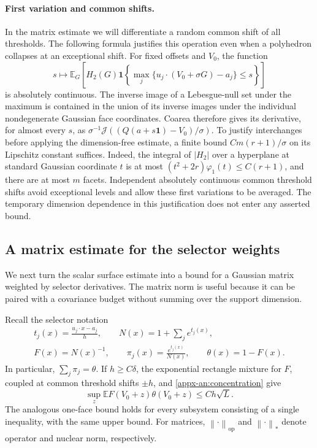 \documentclass[11pt,letterpaper]{article}
\theoremstyle{remark}
\newcommand{\E}{\mathbb E}
\newcommand{\norm}[1]{\left\lVert#1\right\rVert}
\newcommand{\ind}{\mathbf 1}
\newcommand{\Hh}{H_2}
\newcommand{\surf}{\mathcal J}
\begin{document}
\paragraph{First variation and common shifts.}
In the matrix estimate we will differentiate a random common shift of
all thresholds. The following formula justifies this operation even when
a polyhedron collapses at an exceptional shift. For fixed offsets and \(V_0\), the function
\[
 s\longmapsto
 \E_G\left[\Hh(G)\ind\left\{
   \max_j\{u_j\cdot(V_0+\sigma G)-a_j\}\le s\right\}\right]
\]
is absolutely continuous.  The inverse image of a Lebesgue-null set
under the maximum is contained in the union of its inverse images
under the individual nondegenerate Gaussian face coordinates.  Coarea
therefore gives its derivative, for almost every \(s\), as
\(\sigma^{-1}\surf((Q(a+s\mathbf1)-V_0)/\sigma)\).
To justify interchanges before applying the dimension-free estimate,
a finite bound \(Cm(r+1)/\sigma\) on its Lipschitz constant suffices.
Indeed, the integral of \(|\Hh|\) over a hyperplane at standard
Gaussian coordinate \(t\) is at most
\((t^2+2r)\varphi_1(t)\le C(r+1)\), and there are at most \(m\)
facets.  Independent absolutely continuous common threshold shifts
avoid exceptional levels and allow these first variations to be
averaged.  The temporary dimension dependence in this justification
does not enter any asserted bound.

\subsection{A matrix estimate for the selector weights}
\label{appx-an:sec:matrix}

We next turn the scalar surface estimate into a bound for a Gaussian
matrix weighted by selector derivatives.  The matrix norm is useful
because it can be paired with a covariance budget without summing over
the support dimension.

Recall the selector notation
\begin{gather*}
 t_j(x)=\frac{u_j\cdot x-a_j}{h},\qquad
 N(x)=1+\sum_je^{t_j(x)},\\
 F(x)=N(x)^{-1},\qquad
 \pi_j(x)=\frac{e^{t_j(x)}}{N(x)},\qquad \theta(x)=1-F(x).
\end{gather*}
In particular, \(\sum_j\pi_j=\theta\).  If \(h\ge C\delta\),
the exponential rectangle mixture for \(F\), coupled at common
threshold shifts \(\pm h\), and \eqref{appx-an:concentration} give
\begin{equation}
 \sup_z\E F(V_0+z)\theta(V_0+z)\le Ch\sqrt L.
 \label{appx-an:weight-concentration}
\end{equation}
The analogous one-face bound holds for every subsystem consisting
of a single inequality, with the same upper bound.
For matrices, \(\norm{\cdot}_{\mathrm{op}}\) and
\(\norm{\cdot}_*\) denote operator and nuclear norm, respectively.
\end{document}
